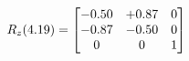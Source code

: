 \documentclass[preview]{standalone}
\begin{document}
\begin{align*}
\special{dvisvgm:raw <g id='unique000'>}R_{z}(4.19) = \begin{bmatrix}-0.50 & +0.87 & 0 \\-0.87 & -0.50 & 0 \\0 & 0 & 1\end{bmatrix}\special{dvisvgm:raw </g>}
\end{align*}
\end{document}
